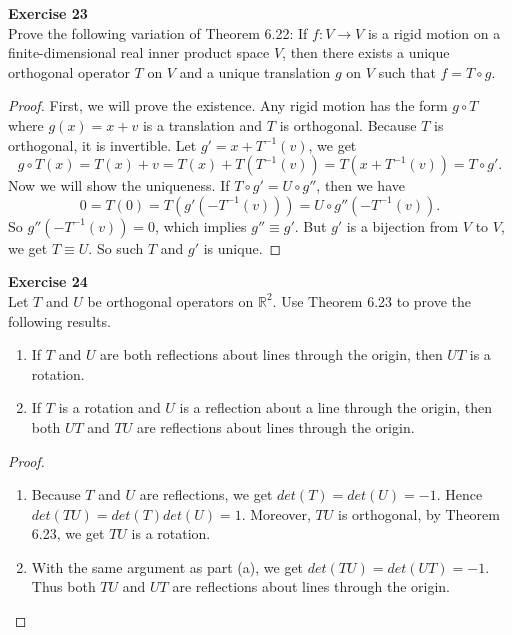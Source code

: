 \documentclass[12pt, a4paper]{article}
\theoremstyle{plain}
\newcommand{\R}{\mathbb{R}}
\newenvironment{exercise}[2][Exercise]
    { \begin{mdframed}[backgroundcolor=gray!20] \textbf{#1 #2} \\}
    {  \end{mdframed}}
\begin{document}
\begin{exercise}{23}
Prove the following variation of Theorem 6.22: If $f:V\rightarrow V$ is a rigid motion on a finite-dimensional real inner product space $V$, then there exists a unique orthogonal operator $T$ on $V$ and a unique translation $g$ on $V$ such that $f = T\circ g$.
\end{exercise}
	\begin{proof}
	First, we will prove the existence. Any rigid motion has the form $g\circ T$ where $g(x) = x+v$ is a translation and $T$ is orthogonal. Because $T$ is orthogonal, it is invertible. Let $g' = x + T^{-1}(v)$, we get 
	\[
	g\circ T(x) = T(x)+v = T(x) + T(T^{-1}(v)) = T(x+T^{-1}(v)) = T\circ g'.
	\]
	Now we will show the uniqueness. If $T\circ g' = U\circ g''$, then we have
	\[
	0 = T(0) = T(g'(-T^{-1}(v))) = U\circ g''(-T^{-1}(v)).
	\]
	So $g''(-T^{-1}(v)) = 0$, which implies $g''\equiv g'$. But $g'$ is a bijection from $V$ to $V$, we get $T\equiv U$. So such $T$ and $g'$ is unique.
	\end{proof}
	
\begin{exercise}{24}
Let $T$ and $U$ be orthogonal operators on $\R^2$. Use Theorem 6.23 to prove the following results.
\begin{enumerate}[label=(\alph*)]
\item If $T$ and $U$ are both reflections about lines through the origin, then $UT$ is a rotation.
\item If $T$ is a rotation and $U$ is a reflection about a line through the origin, then both $UT$ and $TU$ are reflections about lines through the origin.
\end{enumerate}
\end{exercise}
	\begin{proof}
	\hfill
	\begin{enumerate}[label=(\alph*)]
	\item Because $T$ and $U$ are reflections, we get $det(T) = det(U) = -1$. Hence $det(TU)=det(T)det(U)=1$. Moreover, $TU$ is orthogonal, by Theorem 6.23, we get $TU$ is a rotation.
	\item With the same argument as part (a), we get $det(TU) = det(UT) = -1$. Thus both $TU$ and $UT$ are reflections about lines through the origin.
	\end{enumerate}
	\end{proof}
\end{document}
